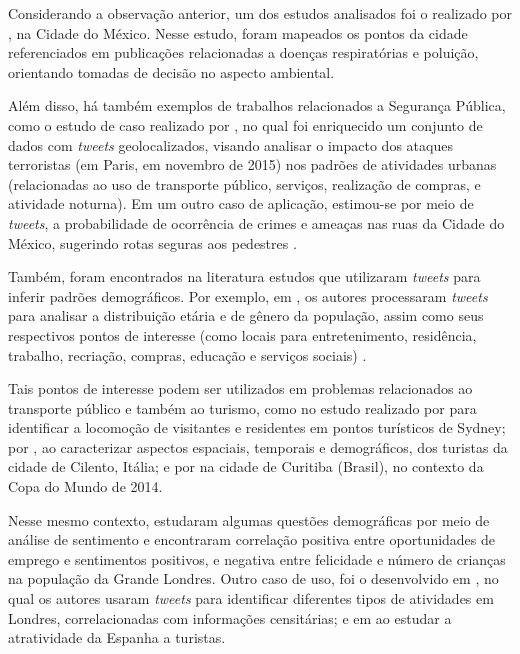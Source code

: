 \documentclass[
	12pt,				%
	oneside,			%
	a4paper,			%
	english,			%
	brazil				%
	]{abntex2ppgsi}
\begin{document}
{{Considerando a observação anterior, um dos estudos analisados foi o realizado por \cite{Zagal2016}, na Cidade do México. Nesse estudo, foram mapeados os pontos da cidade referenciados em publicações relacionadas a doenças respiratórias e poluição, orientando tomadas de decisão no aspecto ambiental. 

Além disso, há também exemplos de trabalhos relacionados a Segurança Pública, como o estudo de caso realizado por \cite{Wen2016}, no qual foi enriquecido um conjunto de dados com \textit{tweets} geolocalizados, visando analisar o impacto dos ataques terroristas (em Paris, em novembro de 2015) nos padrões de atividades urbanas (relacionadas ao uso de transporte público, serviços, realização de compras, e atividade noturna). Em um outro caso de aplicação, estimou-se por meio de \textit{tweets}, a probabilidade de ocorrência de crimes e ameaças nas ruas da Cidade do México, sugerindo rotas seguras aos pedestres \cite{Mata2015}.

Também, foram encontrados na literatura estudos que utilizaram \textit{tweets} para inferir padrões demográficos. Por exemplo, em \cite{Farseev2015, Gkiotsalitis2015, Gkiotsalitis2016}, os autores processaram \textit{tweets} para analisar a distribuição etária e de gênero da população, assim como seus respectivos pontos de interesse (como locais para entretenimento, residência, trabalho, recriação, compras, educação e serviços sociais) \cite{Hasan2014, Maghrebi2015}. 

Tais pontos de interesse podem ser utilizados em problemas relacionados ao transporte público \cite{Gutev2016} e também ao turismo, como no estudo realizado por \cite{Abbasi2015} para identificar a locomoção de visitantes e residentes em pontos turísticos de Sydney; por \cite{Chua2016}, ao caracterizar aspectos espaciais, temporais e demográficos, dos turistas da cidade de Cilento, Itália; e por \cite{Thomaz2016} na cidade de Curitiba (Brasil), no contexto da Copa do Mundo de 2014.

Nesse mesmo contexto, \cite{Guo2016} estudaram algumas questões demográficas por meio de análise de sentimento e encontraram correlação positiva entre oportunidades de emprego e sentimentos positivos, e negativa entre felicidade e número de crianças na população da Grande Londres. Outro caso de uso, foi o desenvolvido em \cite{Steiger2015Census}, no qual os autores usaram \textit{tweets} para identificar diferentes tipos de atividades em Londres, correlacionadas com informações censitárias; e em \cite{Sobolevsky2015} ao estudar a atratividade da Espanha a turistas.

}}
\end{document}
